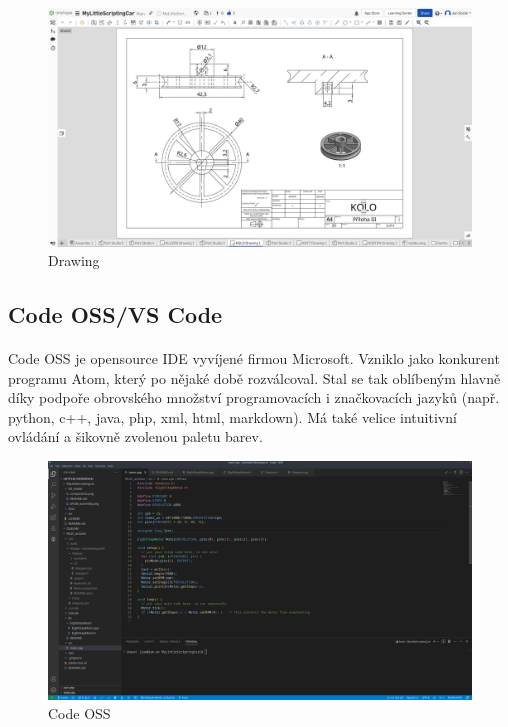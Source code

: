\documentclass[12pt]{article}
\begin{document}
\begin{spacing}{1.5}
	\begin{figure}[h]
		\centering
		\includegraphics[width=\linewidth]{images/drawing_studio.png}
		\caption{Drawing}
		\label{fig:drawing_studio}
	\end{figure}
	
	\subsection{Code OSS/VS Code}
	\paragraph{} Code OSS je opensource IDE vyvíjené firmou Microsoft. Vzniklo jako konkurent programu Atom, který po nějaké době rozválcoval. Stal se tak oblíbeným hlavně díky podpoře obrovského množství programovacích i značkovacích jazyků (např. python, c++, java, php, xml, html, markdown). Má také velice intuitivní ovládání a šikovně zvolenou paletu barev.
	
	\begin{figure}[h]
		\centering
		\includegraphics[width=\linewidth]{images/code_oss.png}
		\caption{Code OSS}
		\label{fig:code_oss}
	\end{figure}
	

\end{spacing}
\end{document}
